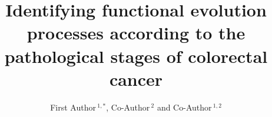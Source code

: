 \documentclass[utf8]{frontiersSCNS} %
\def\firstAuthorLast{Sample {et~al.}} %
\def\Authors{First Author\,$^{1,*}$, Co-Author\,$^{2}$ and Co-Author\,$^{1,2}$}
\begin{document}
\onecolumn
{}

\title[Running Title]{Identifying functional evolution processes according to the pathological stages of colorectal cancer} 

\author[\firstAuthorLast ]{\Authors} %
\address{} %
\correspondance{} %

\extraAuth{}%


\maketitle
\end{document}
